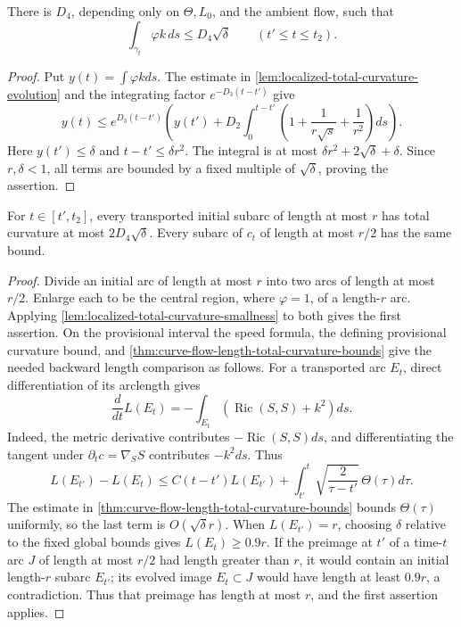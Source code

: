 \begin{theorem}
\label{lem:localized-total-curvature-smallness}
\notready
There is $D_4$, depending only on $\Theta,L_0$, and the ambient flow, such
that
\[
 \int_{\gamma_t}\varphi k\,ds\le D_4\sqrt\delta
 \qquad(t'\le t\le t_2).
\]
\end{theorem}
\begin{proof}
Put $y(t)=\int\varphi kds$.  The estimate in
\ref{lem:localized-total-curvature-evolution} and the integrating
factor $e^{-D_3(t-t')}$ give
\[
 y(t)\le e^{D_3(t-t')}
 \left(y(t')+D_2\int_0^{t-t'}
   \left(1+\frac1{r\sqrt s}+\frac1{r^2}\right)ds\right).
\]
Here $y(t')\le\delta$ and $t-t'\le\delta r^2$.  The integral is at most
$\delta r^2+2\sqrt\delta+\delta$.  Since $r,\delta<1$, all terms are bounded
by a fixed multiple of $\sqrt\delta$, proving the assertion.
\end{proof}

\begin{theorem}
\label{lem:short-subarc-total-curvature-bound}
\notready
For $t\in[t',t_2]$, every transported initial subarc of length at most $r$
has total curvature at most $2D_4\sqrt\delta$.  Every subarc of $c_t$ of
length at most $r/2$ has the same bound.
\end{theorem}
\begin{proof}
Divide an initial arc of length at most $r$ into two arcs of length at most
$r/2$.  Enlarge each to be the central region, where $\varphi=1$, of a
length-$r$ arc.  Applying
\ref{lem:localized-total-curvature-smallness} to both gives the first
assertion.  On the provisional interval the speed formula, the defining
provisional curvature bound, and
\ref{thm:curve-flow-length-total-curvature-bounds} give the needed backward
length comparison as follows.  For a transported arc $E_t$,
direct differentiation of its arclength gives
\[
 \frac d{dt}L(E_t)
 =-\int_{E_t}(\operatorname{Ric}(S,S)+k^2)ds.
\]
Indeed, the metric derivative contributes $-\operatorname{Ric}(S,S)ds$,
and differentiating the tangent under $\partial_tc=\nabla_SS$ contributes
$-k^2ds$.  Thus
\[
 L(E_{t'})-L(E_t)
 \le C(t-t')L(E_{t'})+
 \int_{t'}^t\sqrt{\frac2{\tau-t'}}\,\Theta(\tau)d\tau.
\]
The estimate in \ref{thm:curve-flow-length-total-curvature-bounds} bounds
$\Theta(\tau)$ uniformly, so the last term is $O(\sqrt\delta r)$.  When
$L(E_{t'})=r$, choosing $\delta$
relative to the fixed global bounds gives $L(E_t)\ge0.9r$.  If the preimage
at $t'$ of a time-$t$ arc $J$ of length at most $r/2$ had length greater
than $r$, it would contain an initial length-$r$ subarc $E_{t'}$; its evolved
image $E_t\subset J$ would have length at least $0.9r$, a contradiction.
Thus that preimage has length at most $r$, and the first assertion applies.
\end{proof}

